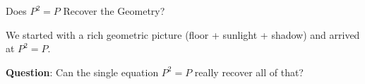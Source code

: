 \documentclass[10pt]{beamer}
\theoremstyle{definition}
\newcommand{\x}[1]{\alert{\textbf{#1}}}
\begin{document}
\begin{frame}{Does $P^2 = P$ Recover the Geometry?}

We started with a rich geometric picture (floor + sunlight + shadow) and arrived at $P^2 = P$.

\vspace{1em}

\x{Question}: Can the single equation $P^2 = P$ really recover all of that?

\end{frame}
\end{document}
